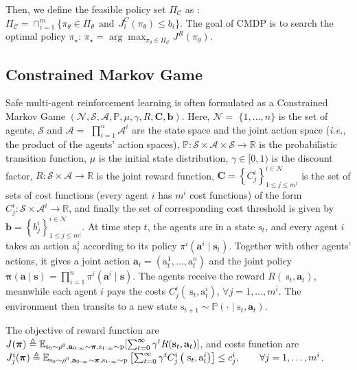 \documentclass{article}
\begin{document}
Then, we define the feasible policy set $\Pi_{\mathcal{C}}$ as : $\Pi_{\mathcal{C}} = \cap_{i=1}^m \{ \pi_\theta \in \Pi_\theta ~~\mathrm{and}~~ J^C_i(\pi_\theta) \le  b_i\}$. The goal of CMDP is to search the optimal policy $\pi_\star$:
    $\pi_\star = \arg \max_{\pi_\theta \in \Pi_{\mathcal{C}}} J^{R}(\pi_\theta)$.

\subsection{Constrained Markov Game}
Safe multi-agent reinforcement learning is often formulated as a Constrained Markov Game $(\mathcal{N}, \mathcal{S}, \mathcal{A}, \mathbb{P}, \mu, \gamma, R, \bm{C}, \bm{b})$. Here, $\mathcal{N}=$ $\{1, \ldots, n\}$ is the set of agents, $\mathcal{S}$ and $\mathcal{A}=$ $\prod_{i=1}^n \mathcal{A}^i$ are the state space and the joint action space (\textit{i.e.}, the product of the agents' action spaces), $\mathbb{P}: \mathcal{S} \times \mathcal{A} \times \mathcal{S} \rightarrow \mathbb{R}$ is the probabilistic transition function, $\mu$ is the initial state distribution, $\gamma \in[0,1)$ is the discount factor, $R: \mathcal{S} \times \mathcal{A} \rightarrow \mathbb{R}$ is the joint reward function, $\bm{C}=\left\{C_j^i\right\}_{1 \leq j \leq m^i}^{i \in \mathcal{N}}$ is the set of sets of cost functions (every agent $i$ has $m^i$ cost functions) of the form $C_j^i: \mathcal{S} \times \mathcal{A}^i \rightarrow \mathbb{R}$, and finally the set of corresponding cost threshold is given by $\bm{b}=\left\{b_j^i\right\}_{1 \leq j \leq m^i}^{i \in \mathcal{N}}$. At time step $t$, the agents are in a state $\mathrm{s}_t$, and every agent $i$ takes an action $\mathrm{a}_t^i$ according to its policy $\pi^i\left(\mathbf{a}^i \mid \mathbf{s}_t\right)$. Together with other agents' actions, it gives a joint action $\mathbf{a}_t=\left(\mathrm{a}_t^1, \ldots, \mathrm{a}_t^n\right)$ and the joint policy $\boldsymbol{\pi}(\mathbf{a} \mid \mathbf{s})=\prod_{i=1}^n \pi^i\left(\mathbf{a}^i \mid \mathbf{s}\right)$. The agents receive the reward $R\left(\mathrm{~s}_t, \mathbf{a}_t\right)$, meanwhile each agent $i$ pays the costs $C_j^i\left(\mathrm{~s}_t, \mathrm{a}_t^i\right)$, $\forall j=1, \ldots, m^i$. The environment then transits to a new state $\mathrm{s}_{t+1} \sim \mathbb{P}\left(\cdot \mid \mathrm{s}_t, \mathbf{a}_t\right)$.

The objective of reward function are $J(\bm{\pi}) \triangleq \mathbb{E}_{\mathrm{s}_0 \sim \rho^0, \mathbf{a}_{0: \infty} \sim \boldsymbol{\pi}, \mathrm{s}_{1: \infty} \sim \mathrm{p}} \qty[ \sum_{t=0}^{\infty} \gamma^t R \qty( \mathbf{s}_t, \mathbf{a}_t ) ]
$, and costs function are $ J_j^i(\vb*{\pi}) \triangleq \mathbb{E}_{\mathrm{s}_0 \sim \rho^0, \mathbf{a}_{0: \infty} \sim \boldsymbol{\pi}, \mathrm{s}_{1: \infty} \sim \mathrm{p}}\left[\sum_{t=0}^{\infty} \gamma^t C_j^i\left(\mathrm{~s}_t, \mathrm{a}_t^i\right)\right] \leq c_j^i, \qquad \forall j=1, \ldots, m^i$.
\end{document}
